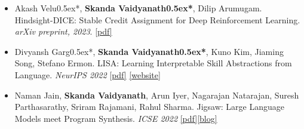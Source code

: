\begin{itemize}
    \item Akash Velu\raise0.5ex\hbox{*}, \textbf{Skanda Vaidyanath\raise0.5ex\hbox{*}}, Dilip Arumugam. Hindsight-DICE: Stable Credit Assignment for Deep Reinforcement Learning. \textit{arXiv preprint, 2023}. \href{https://arxiv.org/pdf/2307.11897.pdf}{[pdf]}
    \item Divyansh Garg\raise0.5ex\hbox{*}, \textbf{Skanda Vaidyanath\raise0.5ex\hbox{*}}, Kuno Kim, Jiaming Song, Stefano Ermon. LISA: Learning Interpretable Skill Abstractions from Language. \textit{NeurIPS 2022} \href{https://arxiv.org/pdf/2203.00054.pdf}{[pdf]} \href{https://div99.github.io/LISA/}{[website]}
    \item Naman Jain, \textbf{Skanda Vaidyanath}, Arun Iyer, Nagarajan Natarajan, Suresh Parthasarathy, Sriram Rajamani, Rahul Sharma. Jigsaw: Large Language Models meet Program Synthesis. \textit{ICSE 2022} \href{https://arxiv.org/abs/2112.02969}{[pdf]}\href{https://www.microsoft.com/en-us/research/blog/jigsaw-fixes-bugs-in-machine-written-software/}{[blog]}
\end{itemize}


